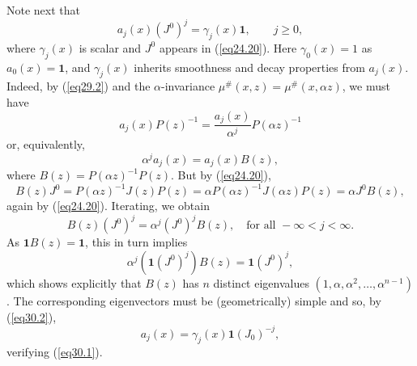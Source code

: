 \documentclass{surv-l}
\theoremstyle{plain}
\theoremstyle{definition}
\numberwithin{equation}{chapter}
\begin{document}
Note next that
\begin{equation}\label{eq30.1}
a_{j}(x)(J^{0})^{j}=\gamma_{j}(x)\mathbf{1},\qquad j\geq 0,
\end{equation}
where $\gamma_{j}(x)$ is scalar and $J^{0}$ appears in (\ref{eq24.20}). Here $\gamma_{0}(x)=1$ as $a_{0}(x)=\textbf{1}$, and $\gamma_{j}(x)$ inherits smoothness and decay properties from $a_{j}(x)$. Indeed, by (\ref{eq29.2}) and the $\alpha$-invariance $\mu^{\#}(x, z)=\mu^{\#}(x, \alpha z)$, we must have
\begin{equation*}
a_{j}(x)P(z)^{-1}=\frac{a_{j}(x)}{\alpha^{j}}P(\alpha z)^{-1}
\end{equation*}
or, equivalently,
\begin{equation}\label{eq30.2}
\alpha^{j}a_{j}(x)=a_{j}(x)B(z),
\end{equation}
where $B(z)=P(\alpha z)^{-1}P(z)$. But by (\ref{eq24.20}),
\begin{equation*}
B(z)J^{0}=P(\alpha z)^{-1}J(z)P(z)=\alpha P(\alpha z)^{-1}J(\alpha z)P(z)=\alpha J^{0}B(z),
\end{equation*}
again by (\ref{eq24.20}). Iterating, we obtain
\begin{equation}\label{eq30.3}
B(z)(J^{0})^{j}=\alpha^{j}(J^{0})^{j}B(z),\quad \text{for all } -\infty<j<\infty.
\end{equation}
As $\mathbf{1}B(z)=\mathbf{1}$, this in turn implies
\begin{equation}\label{eq30.4}
\alpha^{j}(\mathbf{1}(J^{0})^{j})B(z)=\mathbf{1}(J^{0})^{j},
\end{equation}
which shows explicitly that $B(z)$ has $n$ distinct eigenvalues $(1, \alpha, \alpha^{2},\ldots, \alpha^{n-1})$. The corresponding eigenvectors must be (geometrically) simple and so, by (\ref{eq30.2}),
\begin{equation*}
a_{j}(x)=\gamma_{j}(x)\textbf{1}(J_{0})^{-j},
\end{equation*}
verifying (\ref{eq30.1}).
\end{document}
